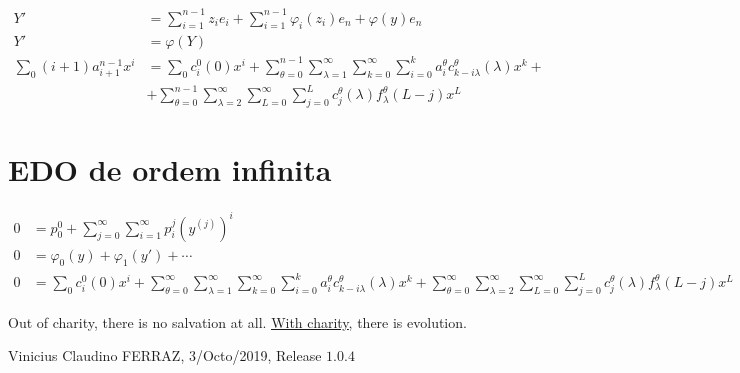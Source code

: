 \documentclass[11pt]{article}
\begin{document}
\begin{align}
 Y' &= \sum_{i=1}^{n-1} z_i e_i + \sum_{i=1}^{n-1} \varphi_i(z_i) e_n + \varphi(y) e_n \\
 Y' &= \varphi(Y) \\
 \sum_0 (i + 1) a_{i + 1}^{n-1} x^i &= \sum_0 c_i^0(0) x^i + \sum_{\theta = 0}^{n-1} \sum_{\lambda = 1}^{\infty} \sum_{k = 0}^{\infty} \sum_{i = 0}^k a_i^{\theta} c_{k - i\lambda}^{\theta}(\lambda) x^k + \nonumber \\
 &+ \sum_{\theta = 0}^{n-1} \sum_{\lambda = 2}^{\infty} \sum_{L = 0}^{\infty}  \sum_{j = 0}^L c_j^{\theta}(\lambda) f_{\lambda}^{\theta}(L-j) x^L
\end{align}

\section{EDO de ordem infinita}


\begin{align}
0 &= p_0^0 + \sum_{j = 0}^{\infty} \sum_{i = 1}^{\infty} p_i^j (y^{(j)})^i \\
 0 &= \varphi_0(y) + \varphi_1(y') + \cdots \\
 0 &= \sum_0 c_i^0(0) x^i + \sum_{\theta = 0}^{\infty} \sum_{\lambda = 1}^{\infty} \sum_{k = 0}^{\infty} \sum_{i = 0}^k a_i^{\theta} c_{k - i\lambda}^{\theta}(\lambda) x^k + \sum_{\theta = 0}^{\infty} \sum_{\lambda = 2}^{\infty} \sum_{L = 0}^{\infty}  \sum_{j = 0}^L c_j^{\theta}(\lambda) f_{\lambda}^{\theta}(L-j) x^L
\end{align}

\vspace{3mm}

Out of charity, there is no salvation at all. \href{https://drive.google.com/file/d/1MvAjsOvsvSIq34uAFz_h16-yVIR3_MvM/view?fbclid=IwAR3cyh3IOcsgGE7M-1TIxh3ESL6IHZ_nAmcF8IGdtnWDZHa1o6mhybQ5eJU}{\underline{With charity}}, there is evolution.

\vspace{3mm}

Vinicius Claudino FERRAZ, 3/Octo/2019, Release $1.0.4$
\end{document}
